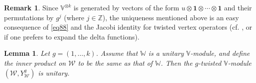 \documentclass[11pt,b5paper,notitlepage]{article}
\theoremstyle{definition}
\newtheorem{rem}[df]{Remark}
\theoremstyle{plain}
\newtheorem{lm}[df]{Lemma}
\newcommand{\mc}{\mathcal}
\newcommand{\id}{\mathbf{1}}
\newcommand{\Vbb}{\mathbb V}
\newcommand{\Wbb}{\mathbb W}
\newcommand{\Zbb}{\mathbb Z}
\numberwithin{equation}{section}
\begin{document}
\begin{rem}\label{lb63}
Since $\Vbb^{\otimes k}$ is generated by vectors of the form $u\otimes\id\otimes\cdots\otimes \id$ and their permutations by $g^j$ (where $j\in\Zbb$), the uniqueness mentioned above is an easy consequence of \eqref{eq88} and the Jacobi identity for twisted vertex operators (cf. \cite[(3.4)]{DLM98}, or \cite[Rem. 10.1]{Gui21} if one prefers to expand the delta functions). 
\end{rem}


\begin{lm}\label{lb64}
Let $g=(1,\dots,k)$. Assume that $\Wbb$ is a unitary $\Vbb$-module, and define the inner product on $\mc W$ to be the same as that of $\Wbb$. Then the $g$-twisted $\Vbb$-module $(\mc W,Y_{\mc W}^g)$ is unitary.
\end{lm}
\end{document}
